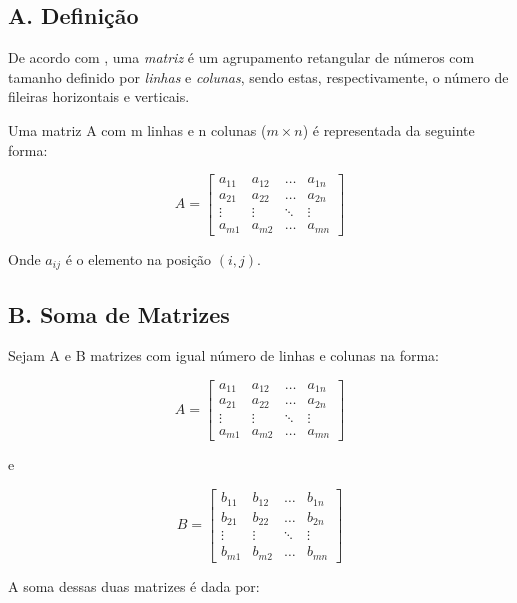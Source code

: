\documentclass[twocolumn, 10pt]{extarticle}
\begin{document}
\subsection*{A. \quad Definição}

De acordo com \cite[p. 26]{antonAlgebra}, uma \textit{matriz} é um agrupamento retangular de números com tamanho definido por \textit{linhas} e \textit{colunas}, sendo estas, respectivamente, o número de fileiras horizontais e verticais.

Uma matriz A com m linhas e n colunas ($m \times n$) é representada da seguinte forma:

\[ 
A = 
\begin{bmatrix}
a_{11} & a_{12} & \dots & a_{1n} \\
a_{21} & a_{22} & \dots & a_{2n} \\
\vdots & \vdots & \ddots & \vdots \\
a_{m1} & a_{m2} & \dots & a_{mn} 

\end{bmatrix}
\]

Onde $a_{ij}$ é o elemento na posição $(i, j)$.


\subsection*{B. \quad Soma de Matrizes}

Sejam A e B matrizes com igual número de linhas e colunas na forma:

\[ 
A = 
\begin{bmatrix}
a_{11} & a_{12} & \dots & a_{1n} \\
a_{21} & a_{22} & \dots & a_{2n} \\
\vdots & \vdots & \ddots & \vdots \\
a_{m1} & a_{m2} & \dots & a_{mn} 

\end{bmatrix}
\]

e

\[ 
B = 
\begin{bmatrix}
b_{11} & b_{12} & \dots & b_{1n} \\
b_{21} & b_{22} & \dots & b_{2n} \\
\vdots & \vdots & \ddots & \vdots \\
b_{m1} & b_{m2} & \dots & b_{mn} 

\end{bmatrix}
\]

A soma dessas duas matrizes é dada por:
\end{document}
